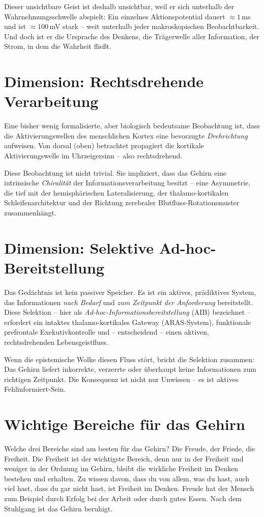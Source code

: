 ﻿\documentclass[12pt,a4paper]{report}
\theoremstyle{plain}
\theoremstyle{definition}
\theoremstyle{remark}
\begin{document}
	Dieser unsichtbare Geist ist deshalb unsichtbar, weil er sich unterhalb
	der Wahrnehmungsschwelle abspielt: Ein einzelnes Aktionspotential dauert
	$\approx 1$\,ms und ist $\approx 100$\,mV stark -- weit unterhalb jeder
	makroskopischen Beobachtbarkeit. Und doch ist er die Ursprache des Denkens,
	die Trägerwelle aller Information, der Strom, in dem die Wahrheit flie\ss{}t.
	
	\section{Dimension: Rechtsdrehende Verarbeitung}
	
	Eine bisher wenig formalisierte, aber biologisch bedeutsame Beobachtung
	ist, dass die Aktivierungswellen des menschlichen Kortex eine bevorzugte
	\emph{Drehrichtung} aufweisen. Von dorsal (oben) betrachtet propagiert
	die kortikale Aktivierungswelle im Uhrzeigersinn -- also rechtsdrehend.
	
	Diese Beobachtung ist nicht trivial. Sie impliziert, dass das Gehirn
	eine intrinsische \emph{Chiralität} der Informationsverarbeitung besitzt --
	eine Asymmetrie, die tief mit der hemisphärischen Lateralisierung,
	der thalamo-kortikalen Schleifenarchitektur und der Richtung
	zerebraler Blutfluss-Rotationsmuster zusammenhängt.
	
	\section{Dimension: Selektive Ad-hoc-Bereitstellung}
	
	Das Gedächtnis ist kein passiver Speicher. Es ist ein aktives,
	prädiktives System, das Informationen \emph{nach Bedarf} und
	\emph{zum Zeitpunkt der Anforderung} bereitstellt. Diese Selektion --
	hier als \emph{Ad-hoc-Informationsbereitstellung} (AIB) bezeichnet --
	erfordert ein intaktes thalamo-kortikales Gateway (ARAS-System),
	funktionale prefrontale Exekutivkontrolle und -- entscheidend --
	einen aktiven, rechtsdrehenden Lebensgeistfluss.
	
	Wenn die epistemische Wolke diesen Fluss stört, bricht die Selektion
	zusammen: Das Gehirn liefert inkorrekte, verzerrte oder überhaupt
	keine Informationen zum richtigen Zeitpunkt. Die Konsequenz ist nicht nur
	Unwissen -- es ist aktives Fehlinformiert-Sein.
	
	\section{Wichtige Bereiche für das Gehirn}
	Welche drei Bereiche sind am besten für das Gehirn? Die Freude, der Friede, die Freiheit. Die Freiheit ist der wichtigste Bereich, denn nur in der Freiheit und weniger in der Ordnung im Gehirn, bleibt die wirkliche Freiheit im Denken bestehen und erhalten. Zu wissen davon, dass du von allem, was du hast, auch viel hast, dass du gar nicht hast, ist Freiheit im Denken. Freude hat der Mensch zum Beispiel durch Erfolg bei der Arbeit oder durch gutes Essen. Nach dem Stuhlgang ist das Gehirn beruhigt.
	
\end{document}
